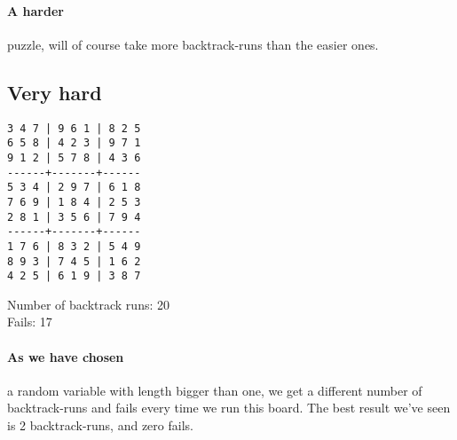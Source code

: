 \documentclass[11pt,a4paper]{article}
\begin{document}
\paragraph{A harder} puzzle, will of course take more backtrack-runs than the easier ones. 
\pagebreak
\subsection{Very hard}
\begin{lstlisting}
3 4 7 | 9 6 1 | 8 2 5
6 5 8 | 4 2 3 | 9 7 1
9 1 2 | 5 7 8 | 4 3 6
------+-------+------
5 3 4 | 2 9 7 | 6 1 8
7 6 9 | 1 8 4 | 2 5 3
2 8 1 | 3 5 6 | 7 9 4
------+-------+------
1 7 6 | 8 3 2 | 5 4 9
8 9 3 | 7 4 5 | 1 6 2
4 2 5 | 6 1 9 | 3 8 7
\end{lstlisting}
Number of backtrack runs: 20 \\
Fails: 17 

\paragraph{As we have chosen} a random variable with length bigger than one, we get a different number of backtrack-runs and fails every time we run this board. The best result we've seen is 2 backtrack-runs, and zero fails. 
\end{document}
